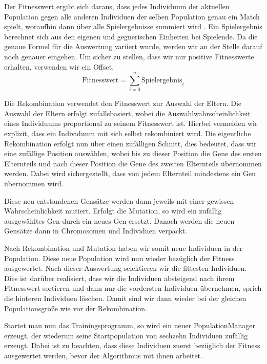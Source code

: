 \documentclass[
	12pt,
	a4paper,
	BCOR10mm,
	DIV14,
	headsepline,
	usegeometry,
]{scrreprt}
\begin{document}
Der Fitnesswert ergibt sich daraus, dass jedes Individuum der aktuellen Population gegen alle anderen Individuen der selben Population genau ein Match spielt, woraufhin dann über alle Spielergebnisse summiert wird .
Ein Spielergebnis berechnet sich aus den eigenen und gegnerischen Einheiten bei Spielende.
Da die genaue Formel für die Auswertung variiert wurde, werden wir an der Stelle darauf noch genauer eingehen.
Um sicher zu stellen, dass wir nur positive Fitnesswerte erhalten, verwenden wir ein Offset.
\begin{equation}\label{eq:fitness}
	\text{Fitnesswert} = \sum_{i=0}^n{\text{Spielergebnis}_{i}}
\end{equation}

Die Rekombination verwendet den Fitnesswert zur Auswahl der Eltern.
Die Auswahl der Eltern erfolgt zufallsbasiert, wobei die Auswahlwahrscheinlichkeit eines Individuums proportional zu seinem Fitnesswert ist.
Hierbei vermeiden wir explizit, dass ein Individuum mit sich selbst rekombiniert wird.
Die eigentliche Rekombination erfolgt nun über einen zufälligen Schnitt, dies bedeutet, dass wir eine zufällige Position auswählen, wobei bis zu dieser Position die Gene des ersten Elternteils und nach dieser Position die Gene des zweiten Elternteils übernommen werden.
Dabei wird sichergestellt, dass von jedem Elternteil mindestens ein Gen übernommen wird.

Diese neu entstandenen Gensätze werden dann jeweils mit einer gewissen Wahrscheinlichkeit mutiert.
Erfolgt die Mutation, so wird ein zufällig ausgewähltes Gen durch ein neues Gen ersetzt.
Danach werden die neuen Gensätze dann in Chromosomen und Individuen verpackt.

Nach Rekombination und Mutation haben wir somit neue Individuen in der Population.
Diese neue Population wird nun wieder bezüglich der Fitness ausgewertet.
Nach dieser Auswertung selektieren wir die fittesten Individuen.
Dies ist darüber realisiert, dass wir die Individuen absteigend nach ihrem Fitnesswert sortieren und dann nur die vordersten Individuen übernehmen, sprich die hinteren Individuen löschen.
Damit sind wir dann wieder bei der gleichen Populationsgröße wie vor der Rekombination.

Startet man nun das Trainingsprogramm, so wird ein neuer PopulationManager erzeugt, der wiederum seine Startpopulation von sechzehn Individuen zufällig erzeugt.
Dabei ist zu beachten, dass diese Individuen zuerst bezüglich der Fitness ausgewertet werden, bevor der Algorithmus mit ihnen arbeitet.
\end{document}
